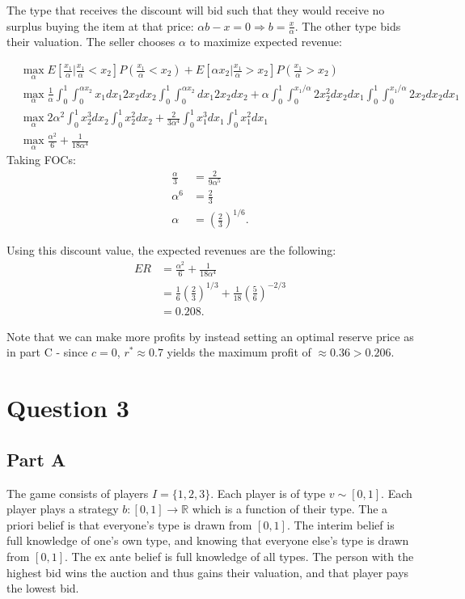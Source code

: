 \documentclass[11pt]{article} %
\begin{document}
The type that receives the discount will bid such that they would receive no surplus buying the item at that price: $\alpha b - x = 0\Rightarrow b = \frac{x}{\alpha}$. The other type bids their valuation. The seller chooses $\alpha$ to maximize expected revenue:

\begin{align*}
&\max_{\alpha} E\left[\frac{x_1}{\alpha}|\frac{x_1}{\alpha}<x_2\right] P\left(\frac{x_1}{\alpha}<x_2\right) + E\left[\alpha x_2|\frac{x_1}{\alpha}>x_2\right] P\left(\frac{x_1}{\alpha}>x_2\right)\\
&\max_{\alpha} \frac{1}{\alpha}\int_{0}^1\int_{0}^{\alpha x_2} x_1 dx_1 2x_2 dx_2 \int_{0}^1\int_{0}^{\alpha x_2} dx_1 2x_2 dx_2 + \alpha \int_{0}^1\int_{0}^{x_1/\alpha} 2x_2^2 dx_2 dx_1 \int_{0}^1\int_{0}^{x_1/\alpha}2x_2 dx_2  dx_1 \\
&\max_{\alpha} 2\alpha^2\int_{0}^1 x_2^3  dx_2 \int_{0}^1 x_2^2 dx_2 + \frac{2}{3\alpha^4}\int_{0}^1 x_1^3 dx_1 \int_{0}^1 x_1^2 dx_1 \\
&\max_{\alpha} \frac{\alpha^2}{6}+ \frac{1}{18\alpha^4} 
\end{align*}
Taking FOCs:
\begin{align*}
\frac{\alpha}{3} &= \frac{2}{9\alpha^5}\\
\alpha^6 &= \frac{2}{3}\\
\alpha &= \left( \frac{2}{3} \right)^{1/6}.
\end{align*}

Using this discount value, the expected revenues are the following:
\begin{align*}
ER &=  \frac{\alpha^2}{6}+ \frac{1}{18\alpha^4} \\
&= \frac{1}{6}\left( \frac{2}{3} \right)^{1/3} + \frac{1}{18}\left( \frac{5}{6} \right)^{-2/3}\\
&= 0.208.
\end{align*}

Note that we can make more profits by instead setting an optimal reserve price as in part C - since $c=0$, $r^{*} \approx 0.7$ yields the maximum profit of $\approx 0.36>0.206$.

\section{Question 3}
\subsection{Part A}
The game consists of players $I = \{ 1,2,3\}$. Each player is of type $v \sim  [0,1]$. Each player plays a strategy $b:[0,1]\rightarrow \mathbb{R}$ which is a function of their type. The a priori belief is that everyone's type is drawn from $[0,1]$. The interim belief is full knowledge of one's own type, and knowing that everyone else's type is drawn from $[0,1]$. The ex ante belief is full knowledge of all types. The person with the highest bid wins the auction and thus gains their valuation, and that player pays the lowest bid.
\end{document}

